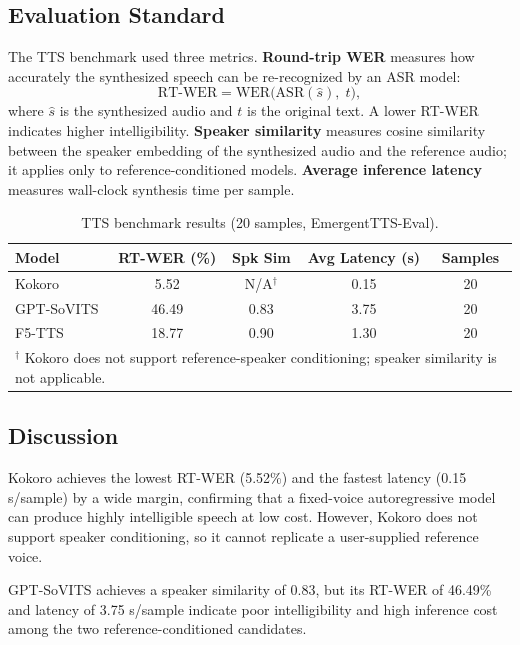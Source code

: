 \documentclass[12pt, a4paper]{article}
\begin{document}
\subsection{Evaluation Standard}

The TTS benchmark used three metrics. \textbf{Round-trip WER} measures how accurately the synthesized speech can be re-recognized by an ASR model:
\[
\mathrm{RT\text{-}WER} = \mathrm{WER}\bigl(\mathrm{ASR}(\hat{s}),\; t\bigr),
\]
where $\hat{s}$ is the synthesized audio and $t$ is the original text. A lower RT-WER indicates higher intelligibility. \textbf{Speaker similarity} measures cosine similarity between the speaker embedding of the synthesized audio and the reference audio; it applies only to reference-conditioned models. \textbf{Average inference latency} measures wall-clock synthesis time per sample.

\begin{table}[H]
\centering
\caption{TTS benchmark results (20 samples, EmergentTTS-Eval).}
\label{tab:tts_results}
\begin{tabular}{lcccc}
\toprule
Model & RT-WER (\%) & Spk Sim & Avg Latency (s) & Samples \\
\midrule
Kokoro     & \phantom{0}5.52 & N/A$^\dagger$ & 0.15 & 20 \\
GPT-SoVITS & 46.49           & 0.83          & 3.75 & 20 \\
F5-TTS     & 18.77           & 0.90          & 1.30 & 20 \\
\bottomrule
\multicolumn{5}{l}{$^\dagger$ Kokoro does not support reference-speaker conditioning; speaker similarity is not applicable.} \\
\end{tabular}
\end{table}

\subsection{Discussion}

Kokoro achieves the lowest RT-WER (5.52\%) and the fastest latency (0.15 s/sample) by a wide margin, confirming that a fixed-voice autoregressive model can produce highly intelligible speech at low cost. However, Kokoro does not support speaker conditioning, so it cannot replicate a user-supplied reference voice.

GPT-SoVITS achieves a speaker similarity of 0.83, but its RT-WER of 46.49\% and latency of 3.75 s/sample indicate poor intelligibility and high inference cost among the two reference-conditioned candidates.
\end{document}

